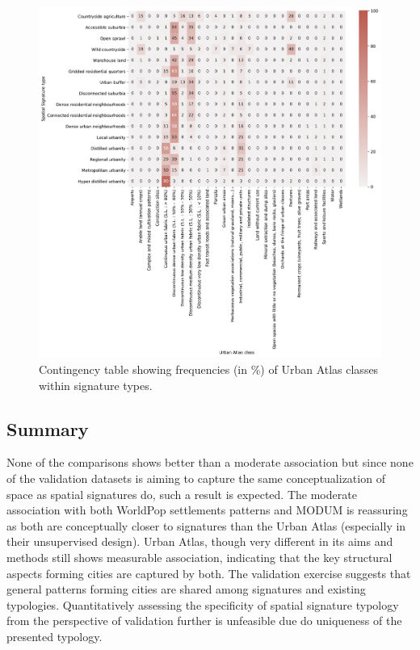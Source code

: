 \begin{figure}
    \centering
    \includegraphics[width=\linewidth]{fig/crosstab_ua.pdf}
    \caption{Contingency table showing frequencies (in \%) of Urban Atlas classes within signature types.}
    \label{fig:crosstab_ua}
\end{figure}

\subsection*{Summary}
None of the comparisons shows better than a moderate association but since none of the
validation datasets is aiming to capture the same conceptualization of space as spatial
signatures do, such a result is expected. The moderate association with both WorldPop
settlements patterns and MODUM is reassuring as both are conceptually closer to
signatures than the Urban Atlas (especially in their unsupervised design). Urban Atlas,
though very different in its aims and methods still shows measurable association,
indicating that the key structural aspects forming cities are captured by both. The
validation exercise suggests that general patterns forming cities are shared among
signatures and existing typologies. Quantitatively assessing the specificity of spatial
signature typology from the perspective of validation further is unfeasible due do
uniqueness of the presented typology.